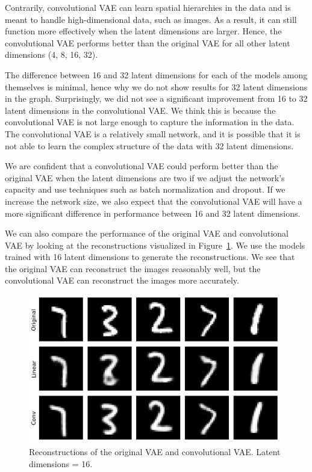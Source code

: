 Contrarily, convolutional VAE can learn spatial hierarchies in the data and is meant to handle high-dimensional data, such as images. As a result, it can still function more effectively when the latent dimensions are larger. Hence, the convolutional VAE performs better than the original VAE for all other latent dimensions (4, 8, 16, 32).

The difference between 16 and 32 latent dimensions for each of the models among themselves is minimal, hence why we do not show results for 32 latent dimensions in the graph. Surprisingly, we did not see a significant improvement from 16 to 32 latent dimensions in the convolutional VAE. We think this is because the convolutional VAE is not large enough to capture the information in the data. The convolutional VAE is a relatively small network, and it is possible that it is not able to learn the complex structure of the data with 32 latent dimensions.

We are confident that a convolutional VAE could perform better than the original VAE when the latent dimensions are two if we adjust the network's capacity and use techniques such as batch normalization and dropout. If we increase the network size, we also expect that the convolutional VAE will have a more significant difference in performance between 16 and 32 latent dimensions.

We can also compare the performance of the original VAE and convolutional VAE by looking at the reconstructions visualized in Figure~\ref{fig:reconstructions}. We use the models trained with 16 latent dimensions to generate the reconstructions. We see that the original VAE can reconstruct the images reasonably well, but the convolutional VAE can reconstruct the images more accurately.


\begin{figure}[h]
    \centering
    \includegraphics[width=11cm]{images/reconstructions.png}
    \setlength{\belowcaptionskip}{-10pt}
    \caption{Reconstructions of the original VAE and convolutional VAE. Latent dimensions = 16.}
    \label{fig:reconstructions}
\end{figure}

